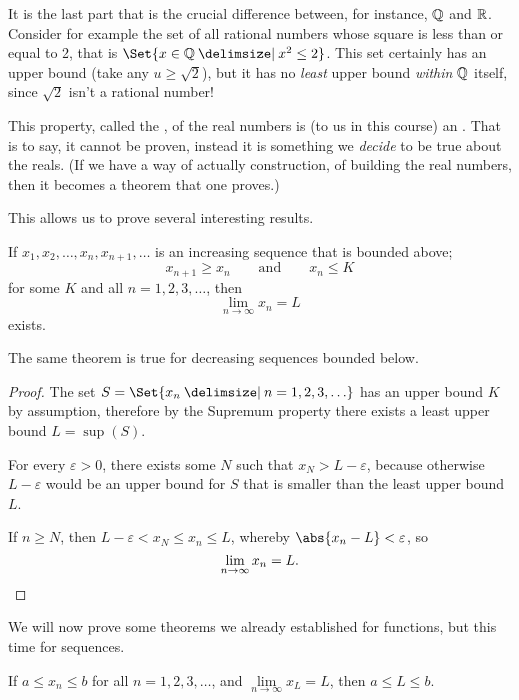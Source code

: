 \noindent
It is the last part that is the crucial difference between, for instance, $\mathbb{Q}$ and $\mathbb{R}$.
Consider for example the set of all rational numbers whose square is less than or equal to 2, that is $\Set{x \in \Q \given x^2 \leq 2}$.
This set certainly has an upper bound (take any $u \geq \sqrt{2}$), but it has no \emph{least} upper bound \emph{within} $\mathbb{Q}$ itself, since $\sqrt{2}$ isn't a rational number!

This property, called the , of the real numbers is (to us in this course) an .
That is to say, it cannot be proven, instead it is something we \emph{decide} to be true about the reals.
(If we have a way of actually construction, of building the real numbers, then it becomes a theorem that one proves.)

This allows us to prove several interesting results.

\begin{theorem}
	If $x_1, x_2, \ldots, x_n, x_{n + 1}, \ldots$ is an increasing sequence that is bounded above;
	\[
		x_{n + 1} \geq x_n \qquad \text{and} \qquad x_n \leq K
	\]
	for some $K$ and all $n = 1, 2, 3, \ldots$, then
	\[
		\lim_{n \to \infty} x_n = L
	\]
	exists.
\end{theorem}

\noindent
The same theorem is true for decreasing sequences bounded below.

\begin{proof}
	The set $S = \Set{x_n \given n = 1, 2, 3, \ldots}$ has an upper bound $K$ by assumption, therefore by the Supremum property there exists a least upper bound $L = \sup(S)$.

	For every $\varepsilon > 0$, there exists some $N$ such that $x_N > L - \varepsilon$, because otherwise $L - \varepsilon$ would be an upper bound for $S$ that is smaller than the least upper bound $L$.

	If $n \geq N$, then $L - \varepsilon < x_N \leq x_n \leq L$, whereby $\abs{x_n - L} < \varepsilon$, so
	\[
		\lim_{n \to \infty} x_n = L. \qedhere
	\]
\end{proof}

\noindent
We will now prove some theorems we already established for functions, but this time for sequences.

\begin{theorem}\label{lec9:seqbound}
	If $a \leq x_n \leq b$ for all $n = 1, 2, 3, \ldots$, and $\lim\limits_{n \to \infty} x_L = L$, then $a \leq L \leq b$.
\end{theorem}

